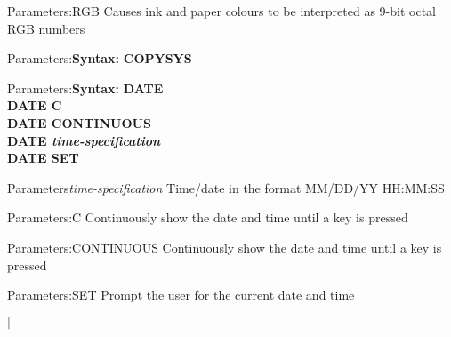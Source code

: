 \documentclass[11pt]{book}
\def\lthtmlcheckvsize{\ifdim\ht\sizebox<\vsize 
  \ifdim\wd\sizebox<\hsize\expandafter\hfill\fi \expandafter\vfill
  \else\expandafter\vss\fi}%
\begin{document}
{\newpage\clearpage
{}%
\begin{labeledpar}{Parameters:}{RGB}
  Causes ink and paper colours to be interpreted as 9-bit octal RGB numbers
\end{labeledpar}%
\lthtmlfigureZ
\lthtmlcheckvsize\clearpage}

{\newpage\clearpage
{}%
\begin{labeledpar}{Parameters:}{\textbf{Syntax:}}
\textbf{COPYSYS}
\end{labeledpar}%
\lthtmlfigureZ
\lthtmlcheckvsize\clearpage}

{\newpage\clearpage
{}%
\begin{labeledpar}{Parameters:}{\textbf{Syntax:}}
\textbf{DATE}\\
\textbf{DATE C}\\
\textbf{DATE CONTINUOUS}\\
\textbf{DATE \textit{time-specification}}\\
\textbf{DATE SET}
\end{labeledpar}%
\lthtmlfigureZ
\lthtmlcheckvsize\clearpage}

{\newpage\clearpage
{}%
\begin{labeledpar}{Parameters}{\textit{time-specification}}
  Time/date in the format MM/DD/YY HH:MM:SS
\end{labeledpar}%
\lthtmlfigureZ
\lthtmlcheckvsize\clearpage}

{\newpage\clearpage
{}%
\begin{labeledpar}{Parameters:}{C}
  Continuously show the date and time until a key is pressed
\end{labeledpar}%
\lthtmlfigureZ
\lthtmlcheckvsize\clearpage}

{\newpage\clearpage
{}%
\begin{labeledpar}{Parameters:}{CONTINUOUS}
  Continuously show the date and time until a key is pressed
\end{labeledpar}%
\lthtmlfigureZ
\lthtmlcheckvsize\clearpage}

{\newpage\clearpage
{}%
\begin{labeledpar}{Parameters:}{SET}
  Prompt the user for the current date and time
\end{labeledpar}%
\lthtmlfigureZ
\lthtmlcheckvsize\clearpage}

{\newpage\clearpage
{}%
\(|\)%
\lthtmlindisplaymathZ
\lthtmlcheckvsize\clearpage}
\end{document}
